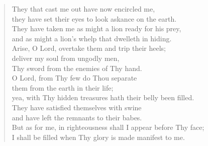 {\begin{verse}
				They that cast me out have now encircled me,\nolinebreak\\
				they have set their eyes to look askance on the earth.\nolinebreak\\
				They have taken me as might a lion ready for his prey,\nolinebreak\\
				and as might a lion's whelp that dwelleth in hiding.\nolinebreak\\
				Arise, O Lord, overtake them and trip their heels;\nolinebreak\\
				deliver my soul from ungodly men,\nolinebreak\\
				Thy sword from the enemies of Thy hand.\nolinebreak\\
				O Lord, from Thy few do Thou separate\nolinebreak\\
				them from the earth in their life;\nolinebreak\\
				yea, with Thy hidden treasures hath their belly been filled.\nolinebreak\\
				They have satisfied themselves with swine\nolinebreak\\
				and have left the remnants to their babes.\nolinebreak\\
				But as for me, in righteousness shall I appear before Thy face;\nolinebreak\\
				I shall be filled when Thy glory is made manifest to me.
			\end{verse}
}
